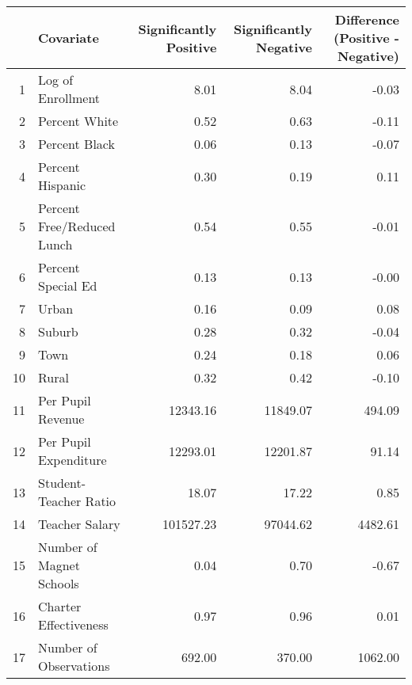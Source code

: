 \begin{tabular}{rlrrr}
  \hline
 & Covariate & Significantly Positive & Significantly Negative & Difference (Positive - Negative) \\ 
  \hline
1 & Log of Enrollment & 8.01 & 8.04 & -0.03 \\ 
  2 & Percent White & 0.52 & 0.63 & -0.11 \\ 
  3 & Percent Black & 0.06 & 0.13 & -0.07 \\ 
  4 & Percent Hispanic & 0.30 & 0.19 & 0.11 \\ 
  5 & Percent Free/Reduced Lunch & 0.54 & 0.55 & -0.01 \\ 
  6 & Percent Special Ed & 0.13 & 0.13 & -0.00 \\ 
  7 & Urban & 0.16 & 0.09 & 0.08 \\ 
  8 & Suburb & 0.28 & 0.32 & -0.04 \\ 
  9 & Town & 0.24 & 0.18 & 0.06 \\ 
  10 & Rural & 0.32 & 0.42 & -0.10 \\ 
  11 & Per Pupil Revenue & 12343.16 & 11849.07 & 494.09 \\ 
  12 & Per Pupil Expenditure & 12293.01 & 12201.87 & 91.14 \\ 
  13 & Student-Teacher Ratio & 18.07 & 17.22 & 0.85 \\ 
  14 & Teacher Salary & 101527.23 & 97044.62 & 4482.61 \\ 
  15 & Number of Magnet Schools & 0.04 & 0.70 & -0.67 \\ 
  16 & Charter Effectiveness & 0.97 & 0.96 & 0.01 \\ 
  17 & Number of Observations & 692.00 & 370.00 & 1062.00 \\ 
   \hline
\end{tabular}
